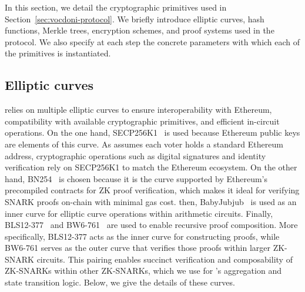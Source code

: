 
In this section, we detail the cryptographic primitives used in Section~\ref{sec:vocdoni-protocol}. We briefly introduce elliptic curves, hash functions, Merkle trees, encryption schemes, and proof systems used in the protocol. We also specify at each step the concrete parameters with which each of the primitives is instantiated.


\subsection{Elliptic curves}
\label{sec:cryptographic-primitives:elliptic-curves}

\Davinci relies on multiple elliptic curves to ensure interoperability with Ethereum, compatibility with available cryptographic primitives, and efficient in-circuit operations. On the one hand, SECP256K1~\cite{brown10sec} is used because Ethereum public keys are elements of this curve. As \Davinci assumes each voter holds a standard Ethereum address, cryptographic operations such as digital signatures and identity verification rely on SECP256K1 to match the Ethereum ecosystem. On the other hand, BN254~\cite{jancar20bn256} is chosen because it is the curve supported by Ethereum's precompiled contracts for ZK proof verification, which makes it ideal for verifying SNARK proofs on-chain with minimal gas cost. then, BabyJubjub~\cite{belles21twisted} is used as an inner curve for elliptic curve operations within arithmetic circuits. Finally, BLS12-377~\cite{bowe20zexe} and BW6-761~\cite{elhousni20optimized} are used to enable recursive proof composition. More specifically, BLS12-377 acts as the inner curve for constructing proofs, while BW6-761 serves as the outer curve that verifies those proofs within larger ZK-SNARK circuits. This pairing enables succinct verification and composability of ZK-SNARKs within other ZK-SNARKs, which we use for \davinci’s aggregation and state transition logic. Below, we give the details of these curves.

